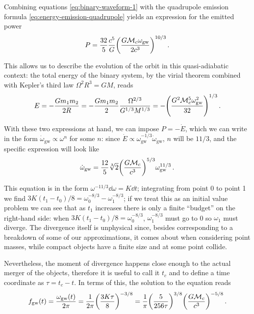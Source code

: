 \documentclass[main.tex]{subfiles}
\begin{document}
Combining equations \eqref{eq:binary-waveform-1} with the quadrupole emission formula \eqref{eq:energy-emission-quadrupole} yields an expression for the emitted power 
%
\begin{align}
P = \frac{32}{5} \frac{c^{5}}{G} \qty(\frac{G \mathcal{M}_c \omega_{\text{gw}}}{2 c^3})^{10/3}
\,.
\end{align}

This allows us to describe the evolution of the orbit in this quasi-adiabatic context: the total energy of the binary system, by the virial theorem combined with Kepler's third law \(\Omega^2 R^3 = G M\), reads 
%
\begin{align}
E = - \frac{G m_1 m_2 }{2R}  = - \frac{G m_1 m_2 }{2} \frac{\Omega^{2/3}}{G^{1/3} M^{1/3}} = - \qty( \frac{G^2 \mathcal{M}_c^{5} \omega^2 _{\text{gw}}}{32} )^{1/3}
\,.
\end{align}

With these two expressions at hand, we can impose \(P = -  \dot{E}\), which we can write in the form \(\dot{\omega} _{\text{gw}} \propto \omega^{n}\) for some \(n\): since \(\dot{E}\propto \omega _{\text{gw}}^{-1/3} \dot{\omega} _{\text{gw}}\), \(n\) will be \(11/3\), and the specific expression will look like 
%
\begin{align}
\dot{\omega} _{\text{gw}} = \frac{12}{5} \sqrt[3]{2} \qty( \frac{G \mathcal{M}_c}{c^3})^{5/3} \omega _{\text{gw}}^{11/3}
\,.
\end{align}

This equation is in the form \(\omega^{-11/3} \dd{\omega } = K \dd{t}\); integrating from point 0 to point 1 we find \(3K(t_1 - t_0 ) / 8 = \omega_0^{-8/3} - \omega_1^{-8/3}\); if we treat this as an initial value problem we can see that as \(t_1 \) increases there is only a finite ``budget'' on the right-hand side: when \(3K (t_1 - t_0 ) / 8 = \omega_0^{-8/3}\), \(\omega_1^{-8/3}\) must go to 0 so \(\omega_1 \) must diverge. 
The divergence itself is unphysical since, besides corresponding to a breakdown of some of our approximations, it comes about when considering point masses, while compact objects have a finite size and at some point collide. 

Nevertheless, the moment of divergence happens close enough to the actual merger of the objects, therefore it is useful to call it \(t_c\) and to define a time coordinate as \(\tau = t_c - t\).
In terms of this, the solution to the equation reads 
%
\begin{align} \label{eq:gw-frequency-0PN}
f _{\text{gw}} (t) = \frac{\omega _{\text{gw}} (t)}{2 \pi } = \frac{1}{2 \pi }\qty( \frac{ 3 K \tau }{8})^{-3/8} = \frac{1}{\pi } \qty(\frac{ 5}{256 \tau })^{3/8} \qty(\frac{G \mathcal{M}_c}{c^3})^{-5/8}
\,.
\end{align}
\end{document}
